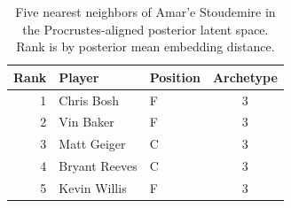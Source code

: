 \begin{table}[htbp]
  \centering\small
  \begin{tabular}{rllc}
    \toprule
    Rank & Player & Position & Archetype \\
    \midrule
    1 & Chris Bosh & F & 3 \\
    2 & Vin Baker & F & 3 \\
    3 & Matt Geiger & C & 3 \\
    4 & Bryant Reeves & C & 3 \\
    5 & Kevin Willis & F & 3 \\
    \bottomrule
  \end{tabular}
  \caption{Five nearest neighbors of Amar'e Stoudemire in the Procrustes-aligned posterior latent space. Rank is by posterior mean embedding distance.}
  \label{tab:Amar_e_Stoudemire_neighbors}
\end{table}

